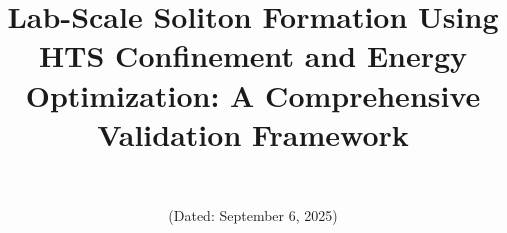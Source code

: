 \documentclass[12pt,a4paper]{article}
\begin{document}
\title{Lab-Scale Soliton Formation Using HTS Confinement and Energy Optimization: A Comprehensive Validation Framework}

\author{\authorname\\\texttt{\authoremail}}
\date{(Dated: September 6, 2025)}

\maketitle
\end{document}

